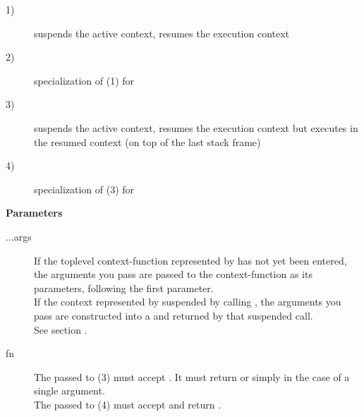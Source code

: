 \begin{description}
    \item[1)] suspends the active context, resumes the execution context
    \item[2)] specialization of (1) for 
    \item[3)] suspends the active context, resumes the execution context but
        executes  in the resumed context (on top of the
        last stack frame)
    \item[4)] specialization of (3) for 
\end{description}

{\bfseries Parameters}
\begin{description}
    \item[...args] If the toplevel context-function represented
                   by  has not yet been entered, the arguments
                   you pass are passed to the context-function as its
                   parameters, following the \cont first parameter. \\
                   If the context represented by  suspended by
                   calling \op, the arguments you pass
                   are constructed into a \contargstup and returned by
                   that suspended \op call. \\
                   See section .\\
    \item[fn]      The  passed to (3) must accept . It
                   must return  or simply  in
                   the case of a single argument.\\
                   The  passed to (4) must accept and return .\\
\end{description}

